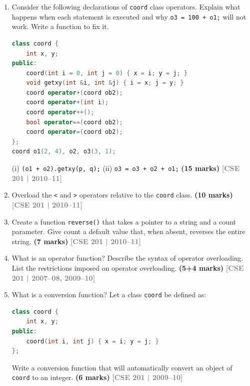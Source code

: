\documentclass[12pt,a3paper]{article}
\newcommand{\yr}[1]{\hfill\textcolor{gray}{\small\textbf{[#1]}}}
\newcommand{\mk}[1]{\textcolor{orange!70!black}{\small\textbf{(#1 marks)}}}
\begin{document}
\begin{enumerate}



\item Consider the following declarations of \texttt{coord} class operators. Explain what happens when each statement is executed and why \texttt{o3 = 100 + o1;} will not work. Write a function to fix it.
\begin{lstlisting}[language=C++]
class coord {
    int x, y;
public:
    coord(int i = 0, int j = 0) { x = i; y = j; }
    void getxy(int &i, int &j) { i = x; j = y; }
    coord operator+(coord ob2);
    coord operator+(int i);
    coord operator++();
    bool operator==(coord ob2);
    coord operator=(coord ob2);
};
coord o1(2, 4), o2, o3(3, 1);
\end{lstlisting}
(i) \texttt{(o1 + o2).getxy(p, q);} \quad (ii) \texttt{o3 = o3 + o2 + o1;}
\mk{15}
\yr{CSE 201 | 2010--11}





\item Overload the \texttt{<} and \texttt{>} operators relative to the \texttt{coord} class. \mk{10}
\yr{CSE 201 | 2010--11}





\item Create a function \texttt{reverse()} that takes a pointer to a string and a count parameter. Give count a default value that, when absent, reverses the entire string. \mk{7}
\yr{CSE 201 | 2010--11}




\item What is an operator function? Describe the syntax of operator overloading. List the restrictions imposed on operator overloading. \mk{5+4}
\yr{CSE 201 | 2007--08, 2009--10}





\item What is a conversion function? Let a class \texttt{coord} be defined as:
\begin{lstlisting}[language=C++]
class coord {
    int x, y;
public:
    coord(int i, int j) { x = i; y = j; }
};
\end{lstlisting}
Write a conversion function that will automatically convert an object of \texttt{coord} to an integer. \mk{6}
\yr{CSE 201 | 2009--10}



\end{enumerate}
\end{document}
